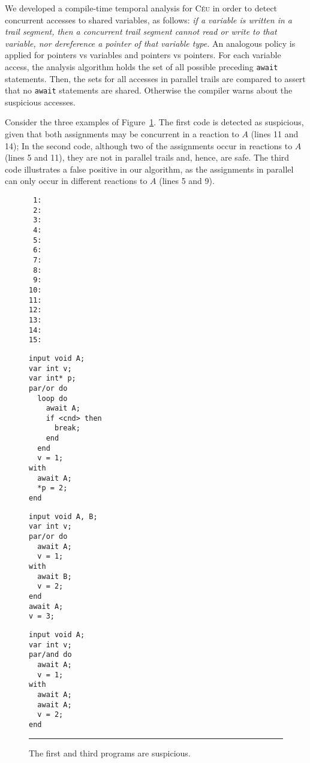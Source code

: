 \documentclass[10pt]{sensys-proc}
\newcommand{\CEU}{\textsc{C\'{e}u}\xspace}
\newcommand{\code}[1] {{\small{\texttt{#1}}}}
\begin{document}

We developed a compile-time temporal analysis for \CEU in order to detect 
concurrent accesses to shared variables, as follows:
\emph{if a variable is written in a trail segment, then a concurrent trail 
segment cannot read or write to that variable, nor dereference a pointer of 
that variable type.}
An analogous policy is applied for pointers vs variables and pointers vs 
pointers.
For each variable access, the analysis algorithm holds the set of all possible 
preceding \code{await} statements.
Then, the sets for all accesses in parallel trails are compared to assert that 
no \code{await} statements are shared.
Otherwise the compiler warns about the suspicious accesses.

Consider the three examples of Figure~\ref{lst.det}.
The first code is detected as suspicious, given that both assignments may be 
concurrent in a reaction to $A$ (lines 11 and 14);
In the second code, although two of the assignments occur in reactions to $A$ 
(lines 5 and 11), they are not in parallel trails and, hence, are safe.
The third code illustrates a false positive in our algorithm, as the 
assignments in parallel can only occur in different reactions to $A$ (lines 5 
and 9).

\begin{figure}[t]
\begin{minipage}[t]{0.05\linewidth}
{\small
\begin{verbatim}
 1:
 2:
 3:
 4:
 5:
 6:
 7:
 8:
 9:
10:
11:
12:
13:
14:
15:
\end{verbatim}
}
\end{minipage}
\hspace{0cm}
\begin{minipage}[t]{0.32\linewidth}
{\small
\begin{verbatim}
input void A;
var int v;
var int* p;
par/or do
  loop do
    await A;
    if <cnd> then
      break;
    end
  end
  v = 1;
with
  await A;
  *p = 2;
end
\end{verbatim}
}
\end{minipage}
\hspace{0cm}
\begin{minipage}[t]{0.29\linewidth}
{\small
\begin{verbatim}
input void A, B;
var int v;
par/or do
  await A;
  v = 1;
with
  await B;
  v = 2;
end
await A;
v = 3;
\end{verbatim}
}
\end{minipage}
\hspace{0cm}
\begin{minipage}[t]{0.25\linewidth}
{\small
\begin{verbatim}
input void A;
var int v;
par/and do
  await A;
  v = 1;
with
  await A;
  await A;
  v = 2;
end
\end{verbatim}
}
\end{minipage}
\rule{8.5cm}{0.37pt}
\caption{ The first and third programs are suspicious.
\label{lst.det}
}
\end{figure}
\end{document}

